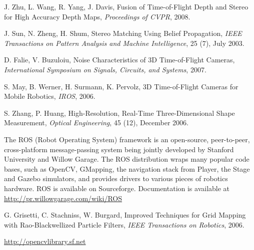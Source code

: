 \documentclass[letterpaper, 10 pt, conference]{ieeeconf}  %
\begin{document}
\begin{thebibliography}{99}
J. Zhu, L. Wang, R. Yang, J. Davis, Fusion of Time-of-Flight Depth and Stereo for High Accuracy Depth Maps, {\it Proceedings of CVPR}, 2008.

J. Sun, N. Zheng, H. Shum, Stereo Matching Using Belief Propagation, {\it IEEE Transactions on Pattern Analysis and Machine Intelligence}, 25 (7), July 2003.

D. Falie, V. Buzuloiu, Noise Characteristics of 3D Time-of-Flight Cameras, {\it International Symposium on Signals, Circuits, and Systems}, 2007.

S. May, B. Werner, H. Surmann, K. Pervolz, 3D Time-of-Flight Cameras for Mobile Robotics, {\it IROS}, 2006.

S. Zhang, P. Huang, High-Resolution, Real-Time Three-Dimensional Shape Measurement, {\it Optical Engineering}, 45 (12), December 2006.

The ROS (Robot Operating System) framework is an open-source, peer-to-peer,
cross-platform message-passing system being jointly developed by Stanford
University and Willow Garage. The ROS distribution wraps many popular code
bases, such as OpenCV, GMapping, the navigation stack from Player, the Stage
and Gazebo simulators, and provides drivers to various pieces of robotics
hardware. ROS is available on Sourceforge. Documentation is available at\\
\url{http://pr.willowgarage.com/wiki/ROS}

G. Grisetti, C. Stachniss, W. Burgard, Improved Techniques for Grid Mapping with Rao-Blackwellized Particle Filters, {\it IEEE Transactions on Robotics}, 2006.

\url{http://opencvlibrary.sf.net}





\end{thebibliography}
\end{document}
